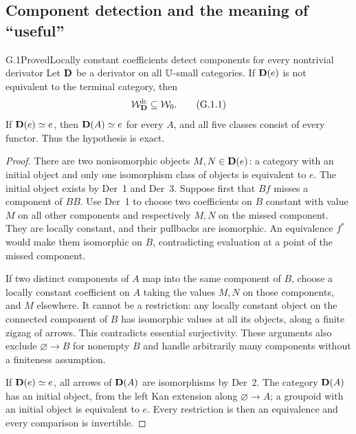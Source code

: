 \subsection{Component detection and the meaning of ``useful''}

\begin{claim}{G.1}{Proved}{Locally constant coefficients detect components for every nontrivial derivator}
Let $\mathbf D$ be a derivator on all $\mathbb U$-small categories. If $\mathbf D(e)$ is
not equivalent to the terminal category, then
\[
 \mathcal W_{\mathbf D}^{\mathrm{lc}}\subseteq\mathcal W_0.
 \tag{G.1.1}
\]
If $\mathbf D(e)\simeq e$, then $\mathbf D(A)\simeq e$ for every $A$, and all
five classes consist of every functor. Thus the hypothesis is exact.
\end{claim}
\begin{proof}
There are two nonisomorphic objects $M,N\in\mathbf D(e)$: a category with
an initial object and only one isomorphism class of objects is
equivalent to $e$. The initial object exists by Der~1 and Der~3.
Suppose first that $Bf$ misses a component of $BB$. Use Der~1 to
choose two coefficients on $B$ constant with value $M$ on all other
components and respectively $M,N$ on the missed component. They are
locally constant, and their pullbacks are isomorphic. An equivalence
$f^*$ would make them isomorphic on $B$, contradicting evaluation
at a point of the missed component.

If two distinct components of $A$ map into the same component of
$B$, choose a locally constant coefficient on $A$ taking the values
$M,N$ on those components, and $M$ elsewhere. It cannot be a
restriction: any locally constant object on the connected component
of $B$ has isomorphic values at all its objects, along a finite zigzag
of arrows. This contradicts essential surjectivity. These arguments
also exclude $\varnothing\to B$ for nonempty $B$ and handle
arbitrarily many components without a finiteness assumption.

If $\mathbf D(e)\simeq e$, all arrows of $\mathbf D(A)$ are isomorphisms by
Der~2. The category $\mathbf D(A)$ has an initial object, from the left Kan
extension along $\varnothing\to A$; a groupoid with an initial
object is equivalent to $e$. Every restriction is then an
equivalence and every comparison is invertible.
\end{proof}

